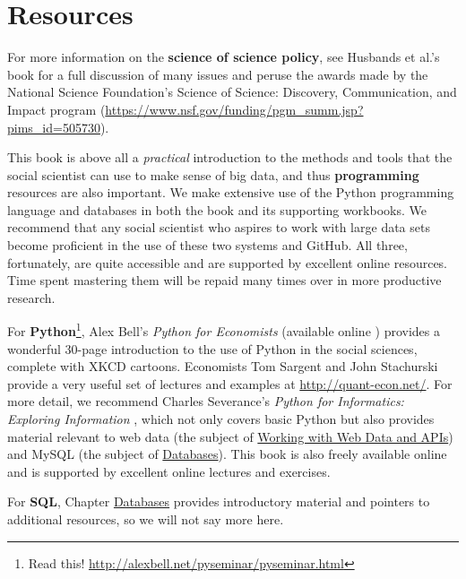 \documentclass[]{krantz}
\begin{document}
\section{Resources}\label{sec:intro:resources}

For more information on the \textbf{science of science policy}, see
Husbands et al.'s book for a full discussion of many issues
\citep{husband2011science} and peruse the awards made by the National
Science Foundation's Science of Science: Discovery, Communication, and
Impact program
(\url{https://www.nsf.gov/funding/pgm_summ.jsp?pims_id=505730}).

This book is above all a \emph{practical} introduction to the methods
and tools that the social scientist can use to make sense of big data,
and thus \textbf{programming} resources are also important. We make
extensive use of the Python programming language and databases in both
the book and its supporting workbooks. We recommend that any social
scientist who aspires to work with large data sets become proficient in
the use of these two systems and GitHub. All three, fortunately, are
quite accessible and are supported by excellent online resources. Time
spent mastering them will be repaid many times over in more productive
research.

For \textbf{Python}\footnote{Read this!
  \url{http://alexbell.net/pyseminar/pyseminar.html}}, Alex Bell's
\emph{Python for Economists} (available online \citep{BellPython})
provides a wonderful 30-page introduction to the use of Python in the
social sciences, complete with XKCD cartoons. Economists Tom Sargent and
John Stachurski provide a very useful set of lectures and examples at
\url{http://quant-econ.net/}. For more detail, we recommend Charles
Severance's \emph{Python for Informatics: Exploring Information}
\citep{SeverancePython}, which not only covers basic Python but also
provides material relevant to web data (the subject of
\protect\hyperlink{chap:web}{Working with Web Data and APIs}) and MySQL
(the subject of \protect\hyperlink{chap:db}{Databases}). This book is
also freely available online and is supported by excellent online
lectures and exercises.

For \textbf{SQL}, Chapter \protect\hyperlink{chap:db}{Databases}
provides introductory material and pointers to additional resources, so
we will not say more here.
\end{document}
